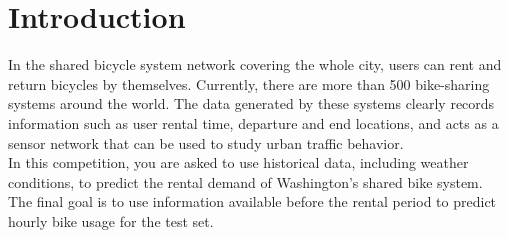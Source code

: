\section{Introduction}\label{sec-intro}











In the shared bicycle system network covering the whole city, users can rent and return bicycles by themselves. Currently, there are more than 500 bike-sharing systems around the world. The data generated by these systems clearly records information such as user rental time, departure and end locations, and acts as a sensor network that can be used to study urban traffic behavior.\\
In this competition, you are asked to use historical data, including weather conditions, to predict the rental demand of Washington's shared bike system.\\
The final goal is to use information available before the rental period to predict hourly bike usage for the test set.


